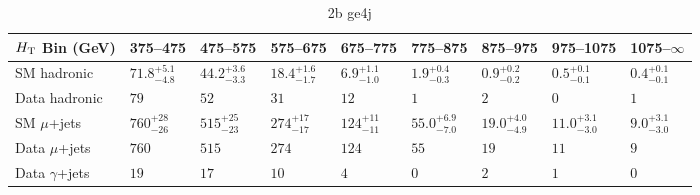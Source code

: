 \documentclass[8pt]{article}
\def\scalht{\mbox{$H_{\rm{T}}$}\xspace}
\newcommand\T{\rule{0pt}{2.6ex}}
\newcommand\B{\rule[-1.2ex]{0pt}{0pt}}
\begin{document}
\begin{table}[ht!]
\caption{2b ge4j}
\label{tab:ensemble-2b ge4j}
\centering
\begin{tabular}{ lllllllll }

\hline
\scalht Bin (GeV)       & 375--475                       & 475--575                       & 575--675                       & 675--775                       & 775--875                       & 875--975                       & 975--1075                      & 1075--$\infty$                 \\ [1.000000ex]
\hline
SM hadronic\T           & $71.8^{+5.1}_{-4.8}$           & $44.2^{+3.6}_{-3.3}$           & $18.4^{+1.6}_{-1.7}$           & $6.9^{+1.1}_{-1.0}$            & $1.9^{+0.4}_{-0.3}$            & $0.9^{+0.2}_{-0.2}$            & $0.5^{+0.1}_{-0.1}$            & $0.4^{+0.1}_{-0.1}$            \\ 
Data hadronic\B         & $79$                           & $52$                           & $31$                           & $12$                           & $1$                            & $2$                            & $0$                            & $1$                            \\ 
\hline
SM $\mu$+jets\T         & $760^{+28}_{-26}$              & $515^{+25}_{-23}$              & $274^{+17}_{-17}$              & $124^{+11}_{-11}$              & $55.0^{+6.9}_{-7.0}$           & $19.0^{+4.0}_{-4.9}$           & $11.0^{+3.1}_{-3.0}$           & $9.0^{+3.1}_{-3.0}$            \\ 
Data $\mu$+jets\B       & $760$                          & $515$                          & $274$                          & $124$                          & $55$                           & $19$                           & $11$                           & $9$                            \\ 
\hline
Data $\gamma$+jets\B    & $19$                           & $17$                           & $10$                           & $4$                            & $0$                            & $2$                            & $1$                            & $0$                            \\ 
\hline

\end{tabular}
\end{table}
\end{document}
